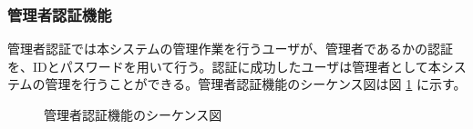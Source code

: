\documentclass[a4j]{jarticle}
\begin{document}
  \subsubsection{管理者認証機能}
  管理者認証では本システムの管理作業を行うユーザが、管理者であるかの認証を、IDとパスワードを用いて行う。認証に成功したユーザは管理者として本システムの管理を行うことができる。管理者認証機能のシーケンス図は図 \ref{fig:admin_admin-login.png} に示す。
  \begin{figure}[H]
    \centering
    \caption{管理者認証機能のシーケンス図}
    \label{fig:admin_admin-login.png}
  \end{figure}
\end{document}

